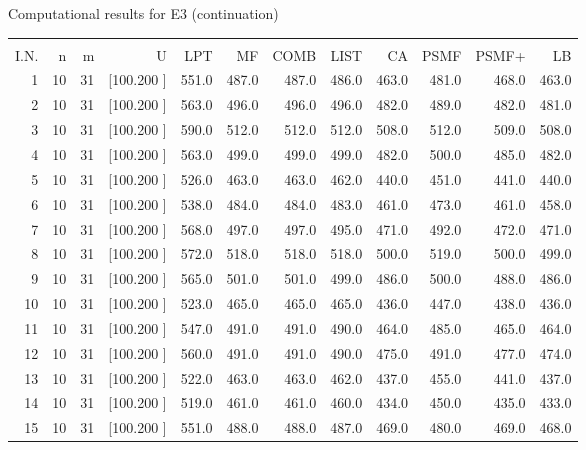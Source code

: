 \documentclass[12pt,a4paper]{article}
\begin{document}
\newpage
\begin{center}
 Computational results for E3 (continuation) {\tiny
\begin{tabular}{r r r r r r r r r r r r}\hline
    &   &   &          &        &        &        &        &        &        &        &       \\[-0.1in]
  I.N.  &  n  &  m  &  U  &  LPT  &  MF  &  COMB  &  LIST  &  CA  & PSMF &PSMF+ & LB \\[0.03in]
\hline
   1& 10& 31&[100.200   ]&   551.0&   487.0&   487.0&   486.0&   463.0&   481.0&   468.0&   463.0\\[-0.02in]
   2& 10& 31&[100.200   ]&   563.0&   496.0&   496.0&   496.0&   482.0&   489.0&   482.0&   481.0\\[-0.02in]
   3& 10& 31&[100.200   ]&   590.0&   512.0&   512.0&   512.0&   508.0&   512.0&   509.0&   508.0\\[-0.02in]
   4& 10& 31&[100.200   ]&   563.0&   499.0&   499.0&   499.0&   482.0&   500.0&   485.0&   482.0\\[-0.02in]
   5& 10& 31&[100.200   ]&   526.0&   463.0&   463.0&   462.0&   440.0&   451.0&   441.0&   440.0\\[-0.02in]
   6& 10& 31&[100.200   ]&   538.0&   484.0&   484.0&   483.0&   461.0&   473.0&   461.0&   458.0\\[-0.02in]
   7& 10& 31&[100.200   ]&   568.0&   497.0&   497.0&   495.0&   471.0&   492.0&   472.0&   471.0\\[-0.02in]
   8& 10& 31&[100.200   ]&   572.0&   518.0&   518.0&   518.0&   500.0&   519.0&   500.0&   499.0\\[-0.02in]
   9& 10& 31&[100.200   ]&   565.0&   501.0&   501.0&   499.0&   486.0&   500.0&   488.0&   486.0\\[-0.02in]
  10& 10& 31&[100.200   ]&   523.0&   465.0&   465.0&   465.0&   436.0&   447.0&   438.0&   436.0\\[-0.02in]
  11& 10& 31&[100.200   ]&   547.0&   491.0&   491.0&   490.0&   464.0&   485.0&   465.0&   464.0\\[-0.02in]
  12& 10& 31&[100.200   ]&   560.0&   491.0&   491.0&   490.0&   475.0&   491.0&   477.0&   474.0\\[-0.02in]
  13& 10& 31&[100.200   ]&   522.0&   463.0&   463.0&   462.0&   437.0&   455.0&   441.0&   437.0\\[-0.02in]
  14& 10& 31&[100.200   ]&   519.0&   461.0&   461.0&   460.0&   434.0&   450.0&   435.0&   433.0\\[-0.02in]
  15& 10& 31&[100.200   ]&   551.0&   488.0&   488.0&   487.0&   469.0&   480.0&   469.0&   468.0\\[-0.02in]

\end{tabular}}
\end{center}
\end{document}
